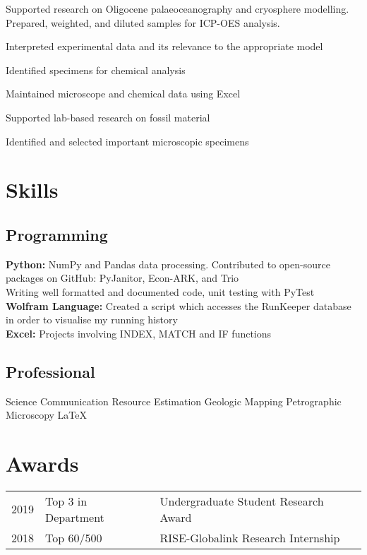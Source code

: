 \documentclass[]{deedy-resume-openfont}
\begin{document}
Supported research on Oligocene palaeoceanography and cryosphere modelling. Prepared, weighted, and diluted samples for ICP-OES analysis. 
\begin{tightemize}
\item Interpreted experimental data and its relevance to the appropriate model
\item Identified specimens for chemical analysis 
\item Maintained microscope and chemical data using Excel 
\end{tightemize}
\sectionsep

\begin{tightemize}
\item Supported lab-based research on fossil material
\item Identified and selected important microscopic specimens
\end{tightemize}
\sectionsep


%
%
\section{Skills} 

\subsection{Programming}

\textbf{Python:} NumPy and Pandas data processing. Contributed to open-source packages on GitHub: PyJanitor, Econ-ARK, and Trio \\
Writing well formatted and documented code, unit testing with PyTest \\
\textbf{Wolfram Language:} Created a script which accesses the RunKeeper database in order to visualise my running history \\
\textbf{Excel:} Projects involving INDEX, MATCH and IF functions 
\sectionsep


\subsection{Professional}
Science Communication \textbullet{} Resource Estimation \textbullet{} Geologic Mapping \textbullet{} Petrographic Microscopy  \textbullet{}  \LaTeX 
\sectionsep


\section{Awards} 
\begin{tabular}{rll}
2019		&  Top 3 in Department & Undergraduate Student Research Award \\
2018		&  Top 60/500  & RISE-Globalink Research Internship \\
 \end{tabular}
\sectionsep
\end{document}
